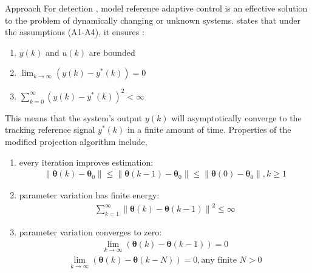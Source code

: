 \begin{section}{Approach}
For detection , model reference adaptive control is an effective solution to the problem of dynamically changing or unknown systems. \cite{tao2003adaptive} states that under the assumptions (A1-A4), it ensures :
	\begin{enumerate}[label=(\roman*),leftmargin=4\parindent]
	\label{assumtions_ensure}
	\item $y(k)$ and $u(k)$ are bounded 
	\item $\lim_{k\to\infty}(y(k)-y^*(k))=0$
	\item $\sum_{k=0}^\infty(y(k)-y^*(k))^2<\infty$
	\end{enumerate}
This means that the system's output $y(k)$ will asymptotically converge to the tracking reference signal $y^*(k)$ in a finite amount of time. Properties of the modified projection algorithm  include,
    \begin{enumerate}[label=(\roman*),leftmargin=3\parindent]
	\item every iteration improves estimation:
	    \begin{align}
	        \|\bm{\theta}(k)-\bm{\theta}_0\|\leq\|\bm{\theta}(k-1)-\bm{\theta}_0\|\leq\|\bm{\theta}(0)-\bm{\theta}_0\|, k\geq1 \nonumber
	    \end{align}
	\item parameter variation has finite energy:
	    \begin{align}
	        \sum_{k=1}^\infty{\|\bm{\theta}(k)-\bm{\theta}(k-1)\|}^2\leq \infty \nonumber
	    \end{align}
	\item parameter variation converges to zero:
	    \begin{align}
	        \lim_{k\to\infty}(\bm{\theta}(k)-\bm{\theta}(k-1))=0 \nonumber
	    \end{align}
	    \begin{align}
	        \lim_{k\to\infty}(\bm{\theta}(k)-\bm{\theta}(k-N))=0, \text{any finite } N>0 \nonumber
	    \end{align}
	\end{enumerate}


\end{section}
